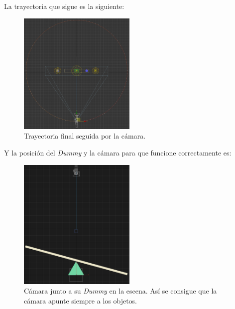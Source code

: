 La trayectoria que sigue es la siguiente:

\begin{figure}[H]
   \centering
   \includegraphics[width=0.5\textwidth]{imagenes/misc/CameraPath.png}
   \caption{Trayectoria final seguida por la cámara.}
\end{figure}

\bigskip

Y la posición del \textit{Dummy} y la cámara para que funcione correctamente es:

\begin{figure}[H]
   \centering
   \includegraphics[width=0.5\textwidth]{imagenes/misc/DummyCamera.png}
   \caption{Cámara junto a su \textit{Dummy} en la escena. Así se consigue que la cámara apunte siempre a los objetos.}
\end{figure}